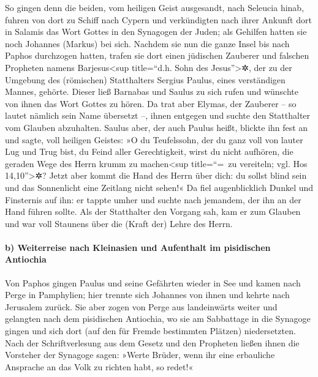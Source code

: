  So gingen denn die beiden, vom heiligen Geist ausgesandt,
nach Seleucia hinab, fuhren von dort zu Schiff nach Cypern
 und verkündigten nach ihrer Ankunft dort in Salamis das
Wort Gottes in den Synagogen der Juden; als Gehilfen hatten sie noch
Johannes (Markus) bei sich.  Nachdem sie nun die ganze
Insel bis nach Paphos durchzogen hatten, trafen sie dort einen jüdischen
Zauberer und falschen Propheten namens Barjesus\textless sup
title=``d.h. Sohn des Jesus''\textgreater✲,  der zu der
Umgebung des (römischen) Statthalters Sergius Paulus, eines verständigen
Mannes, gehörte. Dieser ließ Barnabas und Saulus zu sich rufen und
wünschte von ihnen das Wort Gottes zu hören.  Da trat aber
Elymas, der Zauberer -- so lautet nämlich sein Name übersetzt --, ihnen
entgegen und suchte den Statthalter vom Glauben abzuhalten.
 Saulus aber, der auch Paulus heißt, blickte ihn fest an
und sagte, voll heiligen Geistes:  »O du Teufelssohn, der
du ganz voll von lauter Lug und Trug bist, du Feind aller Gerechtigkeit,
wirst du nicht aufhören, die geraden Wege des Herrn krumm zu
machen\textless sup title=``=~zu vereiteln; vgl. Hos
14,10''\textgreater✲?  Jetzt aber kommt die Hand des
Herrn über dich: du sollst blind sein und das Sonnenlicht eine Zeitlang
nicht sehen!« Da fiel augenblicklich Dunkel und Finsternis auf ihn: er
tappte umher und suchte nach jemandem, der ihn an der Hand führen
sollte.  Als der Statthalter den Vorgang sah, kam er zum
Glauben und war voll Staunens über die (Kraft der) Lehre des Herrn.

\hypertarget{b-weiterreise-nach-kleinasien-und-aufenthalt-im-pisidischen-antiochia}{%
\paragraph{b) Weiterreise nach Kleinasien und Aufenthalt im pisidischen
Antiochia}\label{b-weiterreise-nach-kleinasien-und-aufenthalt-im-pisidischen-antiochia}}

 Von Paphos gingen Paulus und seine Gefährten wieder in
See und kamen nach Perge in Pamphylien; hier trennte sich Johannes von
ihnen und kehrte nach Jerusalem zurück.  Sie aber zogen
von Perge aus landeinwärts weiter und gelangten nach dem pisidischen
Antiochia, wo sie am Sabbattage in die Synagoge gingen und sich dort
(auf den für Fremde bestimmten Plätzen) niedersetzten. 
Nach der Schriftverlesung aus dem Gesetz und den Propheten ließen ihnen
die Vorsteher der Synagoge sagen: »Werte Brüder, wenn ihr eine
erbauliche Ansprache an das Volk zu richten habt, so redet!«

